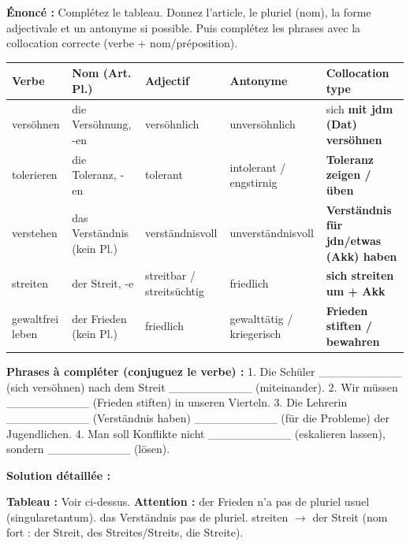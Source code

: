 \documentclass[11pt]{article}
\newcommand{\cle}[1]{{\popxbold\color{popdark}#1}}
\begin{document}
\begin{exoresolu}
\textbf{Énoncé :} Complétez le tableau. Donnez l'article, le pluriel (nom), la forme adjectivale et un antonyme si possible. Puis complétez les phrases avec la collocation correcte (verbe + nom/préposition).

\begin{center}
\begin{tabularx}{\linewidth}{|X|X|X|X|X|}
\hline
\rowcolor{popblueL} \textbf{Verbe} & \textbf{Nom (Art. Pl.)} & \textbf{Adjectif} & \textbf{Antonyme} & \textbf{Collocation type} \\
\hline
versöhnen & die Versöhnung, -en & versöhnlich & unversöhnlich & sich \textbf{mit jdm (Dat) versöhnen} \\
\hline
tolerieren & die Toleranz, -en & tolerant & intolerant / engstirnig & \textbf{Toleranz zeigen / üben} \\
\hline
verstehen & das Verständnis (kein Pl.) & verständnisvoll & unverständnisvoll & \textbf{Verständnis für jdn/etwas (Akk) haben} \\
\hline
streiten & der Streit, -e & streitbar / streitsüchtig & friedlich & \textbf{sich streiten um + Akk} \\
\hline
gewaltfrei leben & der Frieden (kein Pl.) & friedlich & gewalttätig / kriegerisch & \textbf{Frieden stiften / bewahren} \\
\hline
\end{tabularx}
\end{center}

\textbf{Phrases à compléter (conjuguez le verbe) :}
1. Die Schüler \_\_\_\_\_\_\_\_\_\_ (sich versöhnen) nach dem Streit \_\_\_\_\_\_\_\_\_\_ (miteinander).
2. Wir müssen \_\_\_\_\_\_\_\_\_\_ (Frieden stiften) in unseren Vierteln.
3. Die Lehrerin \_\_\_\_\_\_\_\_\_\_ (Verständnis haben) \_\_\_\_\_\_\_\_\_\_ (für die Probleme) der Jugendlichen.
4. Man soll Konflikte nicht \_\_\_\_\_\_\_\_\_\_ (eskalieren lassen), sondern \_\_\_\_\_\_\_\_\_\_ (lösen).

\tcblower
\textbf{Solution détaillée :}

\textbf{Tableau :} Voir ci-dessus. \textbf{Attention :} \cle{der Frieden} n'a pas de pluriel usuel (singularetantum). \cle{das Verständnis} pas de pluriel. \cle{streiten} $\rightarrow$ \cle{der Streit} (nom fort : der Streit, des Streites/Streits, die Streite).


\end{exoresolu}
\end{document}
